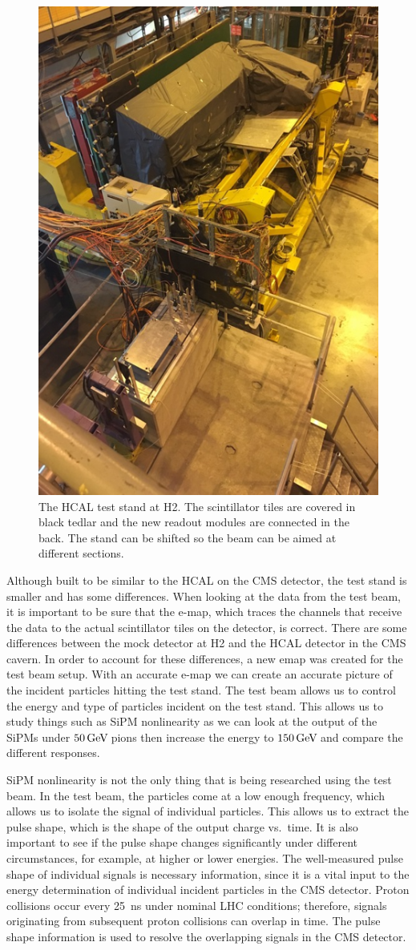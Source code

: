 \begin{figure}
\centering
\includegraphics[width=0.6\linewidth]{Figures/Teststand.png}
\caption{The HCAL test stand at H2. The scintillator tiles are covered in black tedlar and the new readout modules are connected in the back. The stand can be shifted so the beam can be aimed at different sections.}
\label{fig:stand}
\end{figure}

Although built to be similar to the HCAL on the CMS detector, the test stand is smaller and has some differences. When looking at the data from the test beam, it is important to be sure that the e-map, which traces the channels that receive the data to the actual scintillator tiles on the detector, is correct. There are some differences between the mock detector at H2 and the HCAL detector in the CMS cavern. In order to account for these differences, a new emap was created for the test beam setup. With an accurate e-map we can create an accurate picture of the incident particles hitting the test stand. The test beam allows us to control the energy and type of particles incident on the test stand. This allows us to study things such as SiPM nonlinearity as we can look at the output of the SiPMs under $50 {\,\text{Ge\hspace{-.08em}V\hspace{-0.16em}}}$ pions then increase the energy to $150 {\,\text{Ge\hspace{-.08em}V\hspace{-0.16em}}}$ and compare the different responses. 

SiPM nonlinearity is not the only thing that is being researched using the test beam. In the test beam, the particles come at a low enough frequency, which allows us to isolate the signal of individual particles. This allows us to extract the pulse shape, which is the shape of the output charge vs.\ time. It is also important to see if the pulse shape changes significantly under different circumstances, for example, at higher or lower energies. The well-measured pulse shape of individual signals is necessary information, since it is a vital input to the energy determination of individual incident particles in the CMS detector. Proton collisions occur every 25~ns under nominal LHC conditions; therefore, signals originating from subsequent proton collisions can overlap in time. The pulse shape information is used to resolve the overlapping signals in the CMS detector.


